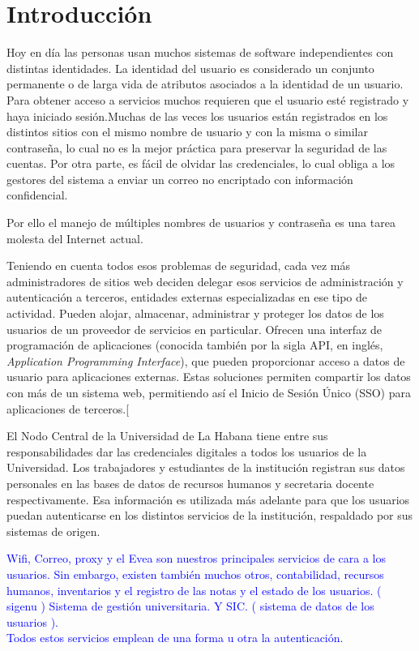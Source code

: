 \chapter*{Introducción}\label{chapter:introduction}

Hoy en día las personas usan muchos sistemas de software independientes con distintas identidades. La identidad del usuario es considerado un conjunto permanente o de larga vida de atributos asociados a la identidad de un usuario. Para obtener acceso a servicios muchos requieren que el usuario esté registrado y haya iniciado sesión.Muchas de las veces los usuarios están registrados en los distintos sitios con el mismo nombre de usuario y con la misma o similar contraseña, lo cual no es la mejor práctica para preservar la seguridad de las cuentas. Por otra parte, es fácil de olvidar las credenciales, lo cual obliga a los gestores del sistema a enviar un correo no encriptado con información confidencial.

Por ello el manejo de múltiples nombres de usuarios y contraseña es una tarea molesta del Internet actual.

Teniendo en cuenta todos esos problemas de seguridad, cada vez más administradores de sitios web deciden delegar esos servicios de administración y autenticación a terceros, entidades externas especializadas en ese tipo de actividad. Pueden alojar, almacenar, administrar y proteger los datos de los usuarios de un proveedor de servicios en particular. Ofrecen una interfaz de programación de aplicaciones (conocida también por la sigla API, en inglés, \textit{Application Programming Interface}), que pueden proporcionar acceso a datos de usuario para aplicaciones externas. Estas soluciones permiten compartir los datos con más de un sistema web, permitiendo así el Inicio de Sesión Único (SSO) para aplicaciones de terceros.[\cite{kutera2016single}

El Nodo Central de la Universidad de La Habana tiene entre sus responsabilidades dar las credenciales digitales a todos los usuarios de la Universidad. Los trabajadores y estudiantes de la institución registran sus datos personales en las bases de datos de recursos humanos y secretaria docente respectivamente. Esa información es utilizada más adelante para que los usuarios puedan autenticarse en los distintos servicios de la institución, respaldado por sus sistemas de origen.

\textcolor{blue}{Wifi, Correo, proxy y el Evea son nuestros principales servicios de cara a los usuarios. Sin embargo, existen también muchos otros, contabilidad, recursos humanos, inventarios y el registro de las notas y el estado de los usuarios. ( sigenu ) Sistema de gestión universitaria. Y SIC. ( sistema de datos de los usuarios ).
\\
Todos estos servicios emplean de una forma u otra la autenticación.
}

